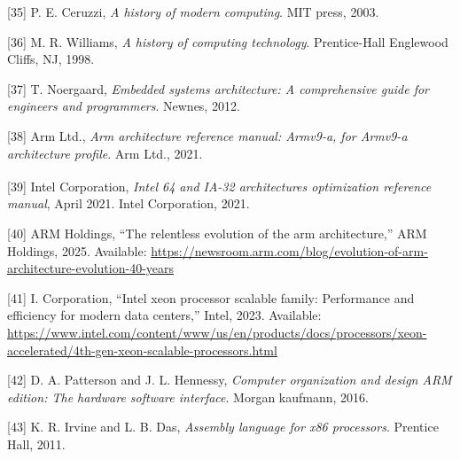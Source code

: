 \documentclass[12pt,oneside]{templates/unerthesis}
\newcommand{\CSLLeftMargin}[1]{#1} %
\newcommand{\CSLRightInline}[1]{#1} %
\newlength{\cslhangindent}
\newenvironment{CSLReferences}[2] %
 {\setlength{\parindent}{0pt}%
  \setlength{\leftskip}{#1 pt\relax}%
  \setlength{\parskip}{#2 pt\relax}%
  \everypar{\setlength{\hangindent}{\cslhangindent}}}
 {\par}
\begin{document}
\begin{CSLReferences}{0}{0}
\leavevmode{}%
\CSLLeftMargin{{[}35{]} }%
\CSLRightInline{P. E. Ceruzzi, \emph{A history of modern computing}. MIT press, 2003.}

\leavevmode{}%
\CSLLeftMargin{{[}36{]} }%
\CSLRightInline{M. R. Williams, \emph{A history of computing technology}. Prentice-Hall Englewood Cliffs, NJ, 1998.}

\leavevmode{}%
\CSLLeftMargin{{[}37{]} }%
\CSLRightInline{T. Noergaard, \emph{Embedded systems architecture: A comprehensive guide for engineers and programmers}. Newnes, 2012.}

\leavevmode{}%
\CSLLeftMargin{{[}38{]} }%
\CSLRightInline{Arm Ltd., \emph{Arm architecture reference manual: Armv9-a, for Armv9-a architecture profile}. Arm Ltd., 2021.}

\leavevmode{}%
\CSLLeftMargin{{[}39{]} }%
\CSLRightInline{Intel Corporation, \emph{Intel\textsuperscript{\textregistered} 64 and IA-32 architectures optimization reference manual}, April 2021. Intel Corporation, 2021.}

\leavevmode{}%
\CSLLeftMargin{{[}40{]} }%
\CSLRightInline{ARM Holdings, {``The relentless evolution of the arm architecture,''} ARM Holdings, 2025. Available: \url{https://newsroom.arm.com/blog/evolution-of-arm-architecture-evolution-40-years}}

\leavevmode{}%
\CSLLeftMargin{{[}41{]} }%
\CSLRightInline{I. Corporation, {``Intel xeon processor scalable family: Performance and efficiency for modern data centers,''} Intel, 2023. Available: \url{https://www.intel.com/content/www/us/en/products/docs/processors/xeon-accelerated/4th-gen-xeon-scalable-processors.html}}

\leavevmode{}%
\CSLLeftMargin{{[}42{]} }%
\CSLRightInline{D. A. Patterson and J. L. Hennessy, \emph{Computer organization and design ARM edition: The hardware software interface}. Morgan kaufmann, 2016.}

\leavevmode{}%
\CSLLeftMargin{{[}43{]} }%
\CSLRightInline{K. R. Irvine and L. B. Das, \emph{Assembly language for x86 processors}. Prentice Hall, 2011.}


\end{CSLReferences}
\end{document}
